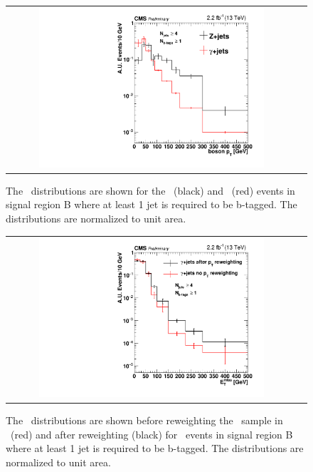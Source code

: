\begin{figure}[!htb]
  \begin{center}
    \begin{tabular}{cc}
      \includegraphics[width=0.8\textwidth]{bkgd/figs/photon_SRB_2p1fb_vs_dilep_ptg_withb.pdf}
    \end{tabular}
    \caption{
      The \pt\ distributions are shown for the \zjets\ (black) and \gjets\ (red) events
      in signal region B where at least 1 jet is required to be b-tagged.
      The distributions are normalized to unit area.
      \label{fig:photonptreweighting}
    }
  \end{center}
\end{figure}

\begin{figure}[!htb]
  \begin{center}
    \begin{tabular}{cc}
      \includegraphics[width=0.8\textwidth]{bkgd/figs/gjets_full2p1_rawMET_withb_SRB_datavsdata_comparereweighted.pdf}
    \end{tabular}
    \caption{
      The \MET\ distributions are shown before reweighting the \gjets\ sample in \pt\ (red) and after reweighting (black)
      for \gjets\ events in signal region B where at least 1 jet is required to be b-tagged.
      The distributions are normalized to unit area.
      \label{fig:metptreweighting}
    }
  \end{center}
\end{figure}


